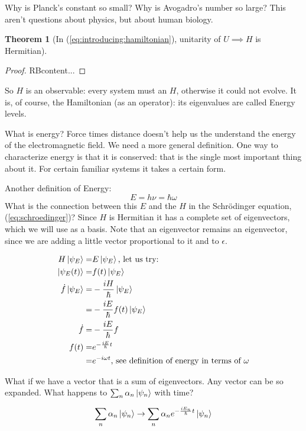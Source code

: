 \documentclass[]{article}
\newtheorem{thm}{Theorem}
\begin{document}
Why is Planck's constant so small? Why is Avogadro's number so large? This aren't questions about physics, but about human biology.

\begin{thm}[In (\ref{eq:introducing:hamiltonian}),  unitarity of $U\implies H$ is Hermitian]
\end{thm}
\begin{proof}
	RB{content...}
\end{proof}

So $H$ is an observable: every system must an $H$, otherwise it could not evolve. It is, of course, the Hamiltonian (as an operator): its eigenvalues are called Energy levels.

What is energy? Force times distance doesn't help us the understand the energy of the electromagnetic field.  We need a more general definition. One way to characterize energy is that it is conserved: that is the single most important thing about it. For certain familiar systems it takes a certain form.

Another definition of Energy:
$$E = h\nu = \hbar \omega$$
What is the connection between this $E$ and the $H$ in the Schr\"odinger equation, (\ref{eq:schroedinger})? Since $H$ is Hermitian it has a complete set of eigenvectors, which we will use as a basis. Note that an eigenvector remains an eigenvector, since we are adding a little vector proportional to it and to $\epsilon$.

\begin{align*}
	H\ket{\psi_E} =& E\ket{\psi_E}\text{, let us try:}\\
	\ket{\psi_E(t)} =& f(t)\ket{\psi_E}\\
	\dot{f}\ket{\psi_E} =& -\frac{iH}{\hbar}\ket{\psi_E}\\
	=& -\frac{iE}{\hbar} f(t) \ket{\psi_E}\\
	\dot{f}=& -\frac{iE}{\hbar} f\\
	f(t) =& e^{-\frac{iE}{\hbar}t}\\
	=& e^{-i \omega t} \text{, see definition of energy in terms of $\omega$}
\end{align*}

What if we have a vector that is a sum of eigenvectors. Any vector can be so expanded. What happens to $\sum_n \alpha_n \ket{\psi_n}$ with time?

\begin{align*}
	\sum_n \alpha_n \ket{\psi_n} \rightarrow \sum_n \alpha_n e^{-\frac{iE_n}{\hbar}t} \ket{\psi_n}
\end{align*}
\end{document}
